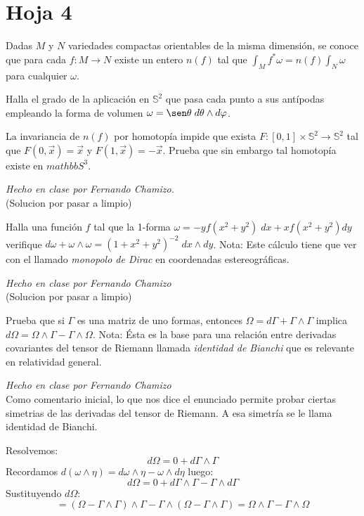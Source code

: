 \section{Hoja 4}

\begin{problem}[7] Dadas $M$ y $N$ variedades compactas orientables de la misma dimensión, se conoce que para cada $f:M\longrightarrow N$ existe un entero $n(f)$ tal que 
	$\int_M f^*\omega= n(f)\int_N\omega$ para cualquier $\omega$.
	
	
	\ppart Halla el grado de la aplicación en $\mathbb{S}^2$ que pasa cada punto a sus antípodas empleando la forma de volumen $\omega=\sen\theta\; d\theta\wedge d\varphi$.
	
	\ppart La invariancia de $n(f)$ por homotopía impide que exista 
	$F:[0,1]\times \mathbb{S}^2\longrightarrow \mathbb{S}^2$ tal que 
	$F(0,\vec{x})=\vec{x}$
	y
	$F(1,\vec{x})=-\vec{x}$.
	Prueba que sin embargo tal homotopía existe en $mathbb{S}^3$. 
	
	\solution\textit{Hecho en clase por Fernando Chamizo.}\\ (Solucion por pasar a limpio)	
\end{problem}

\begin{problem}[8] Halla una función $f$ tal que la 1-forma 
	$\omega= -yf(x^2+y^2)\;dx+xf(x^2+y^2)dy$ 
	verifique 
	$d\omega+\omega\wedge\omega=(1+x^2+y^2)^{-2}\;dx\wedge dy$.
	{\sf Nota:} Este cálculo tiene que ver con el llamado \emph{monopolo de Dirac} en coordenadas estereográficas. 
	
	\solution\textit{Hecho en clase por Fernando Chamizo}\\ (Solucion por pasar a limpio)
\end{problem}

\begin{problem}[9] Prueba que si $\Gamma$ es una matriz de uno formas, entonces 
	$\Omega=d\Gamma+\Gamma\wedge\Gamma$ 
	implica
	$d\Omega=\Omega\wedge\Gamma-\Gamma\wedge\Omega$. 
	{\sf Nota:} Ésta es la base para una relación entre derivadas covariantes  del tensor de Riemann llamada \emph{identidad de Bianchi} que es relevante en relatividad general. 
	
	\solution\textit{Hecho en clase por Fernando Chamizo}\\ Como comentario inicial, lo que nos dice el enunciado permite probar ciertas simetrias de las derivadas del tensor de Riemann. A esa simetría se le llama identidad de Bianchi.
	
	Resolvemos: $$d\Omega=0+d\Gamma\wedge\Gamma$$
	Recordamos $d(\omega\wedge\eta)=d\omega\wedge\eta - \omega\wedge d\eta$ luego: $$d\Omega=0+d\Gamma\wedge\Gamma-\Gamma\wedge d\Gamma$$ Sustituyendo $d\Omega$: $$=(\Omega-\Gamma\wedge\Gamma)\wedge\Gamma-\Gamma\wedge(\Omega-\Gamma\wedge\Gamma)=\Omega\wedge\Gamma-\Gamma\wedge\Omega$$
\end{problem}

